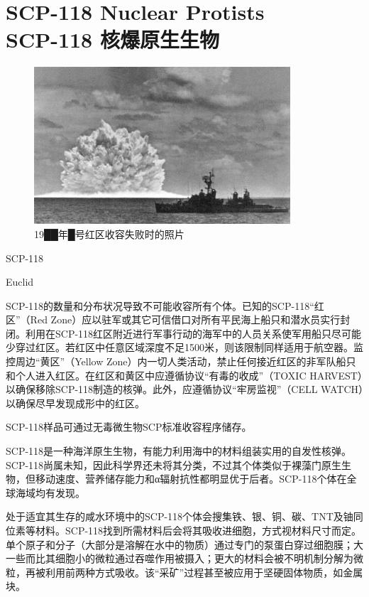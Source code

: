 \chapter[SCP-118 核爆原生生物]{
    SCP-118 Nuclear Protists\\
    SCP-118 核爆原生生物
}

\label{chap:SCP-118}

\begin{figure}[H]
    \centering
    \includegraphics[width=0.5\linewidth]{images/SCP.118.jpg}
    \caption*{19██年█号红区收容失败时的照片}
\end{figure}

SCP-118

Euclid

SCP-118的数量和分布状况导致不可能收容所有个体。已知的SCP-118“红区”（Red Zone）应以驻军或其它可信借口对所有平民海上船只和潜水员实行封闭。利用在SCP-118红区附近进行军事行动的海军中的人员关系使军用船只尽可能少穿过红区。若红区中任意区域深度不足1500米，则该限制同样适用于航空器。监控周边“黄区”（Yellow Zone）内一切人类活动，禁止任何接近红区的非军队船只和个人进入红区。在红区和黄区中应遵循协议“有毒的收成”（TOXIC HARVEST）以确保移除SCP-118制造的核弹。此外，应遵循协议“牢房监视”（CELL WATCH）以确保尽早发现成形中的红区。

SCP-118样品可通过无毒微生物SCP标准收容程序储存。

SCP-118是一种海洋原生生物，有能力利用海中的材料组装实用的自发性核弹。SCP-118尚属未知，因此科学界还未将其分类，不过其个体类似于裸藻门原生生物，但移动速度、营养储存能力和α辐射抗性都明显优于后者。SCP-118个体在全球海域均有发现。

处于适宜其生存的咸水环境中的SCP-118个体会搜集铁、银、铜、碳、TNT及铀同位素等材料。SCP-118找到所需材料后会将其吸收进细胞，方式视材料尺寸而定。单个原子和分子（大部分是溶解在水中的物质）通过专门的泵蛋白穿过细胞膜；大一些而比其细胞小的微粒通过吞噬作用被摄入；更大的材料会被不明机制分解为微粒，再被利用前两种方式吸收。该“采矿”过程甚至被应用于坚硬固体物质，如金属块。

